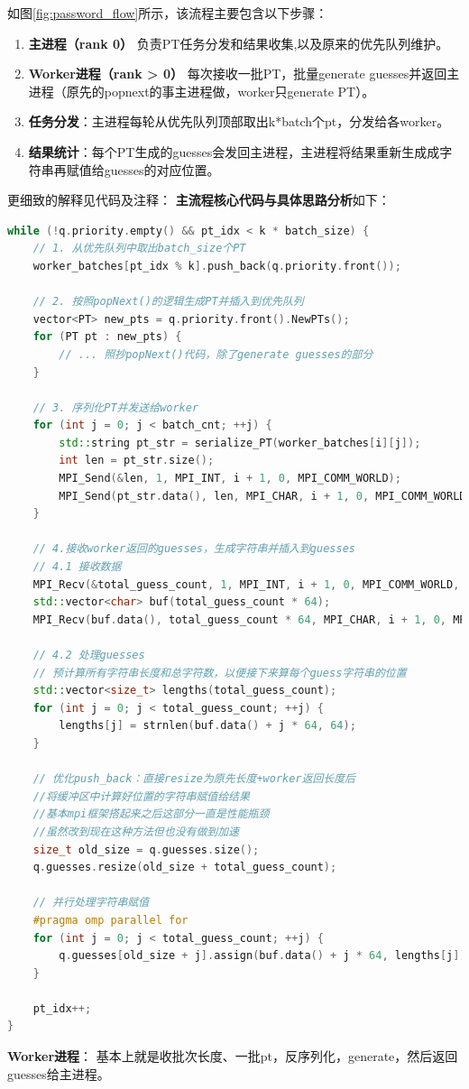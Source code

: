 \documentclass[a4paper]{article}
\begin{document}
如图\ref{fig:password_flow}所示，该流程主要包含以下步骤：
\begin{enumerate}
    \item \textbf{主进程（rank 0）} 负责PT任务分发和结果收集,以及原来的优先队列维护。
    \item \textbf{Worker进程（rank > 0）} 每次接收一批PT，批量generate guesses并返回主进程（原先的popnext的事主进程做，worker只generate PT）。
    \item \textbf{任务分发}：主进程每轮从优先队列顶部取出k*batch个pt，分发给各worker。
    \item \textbf{结果统计}：每个PT生成的guesses会发回主进程，主进程将结果重新生成成字符串再赋值给guesses的对应位置。
\end{enumerate}
更细致的解释见代码及注释：
\textbf{主流程核心代码与具体思路分析}如下：
\begin{lstlisting}[language=C++, caption={MPI并行密码生成算法核心代码}]
while (!q.priority.empty() && pt_idx < k * batch_size) {
    // 1. 从优先队列中取出batch_size个PT
    worker_batches[pt_idx % k].push_back(q.priority.front());
    
    // 2. 按照popNext()的逻辑生成PT并插入到优先队列
    vector<PT> new_pts = q.priority.front().NewPTs();
    for (PT pt : new_pts) {
        // ... 照抄popNext()代码，除了generate guesses的部分
    }
    
    // 3. 序列化PT并发送给worker
    for (int j = 0; j < batch_cnt; ++j) {
        std::string pt_str = serialize_PT(worker_batches[i][j]);
        int len = pt_str.size();
        MPI_Send(&len, 1, MPI_INT, i + 1, 0, MPI_COMM_WORLD);
        MPI_Send(pt_str.data(), len, MPI_CHAR, i + 1, 0, MPI_COMM_WORLD);
    }
    
    // 4.接收worker返回的guesses，生成字符串并插入到guesses
    // 4.1 接收数据
    MPI_Recv(&total_guess_count, 1, MPI_INT, i + 1, 0, MPI_COMM_WORLD, MPI_STATUS_IGNORE);
    std::vector<char> buf(total_guess_count * 64);
    MPI_Recv(buf.data(), total_guess_count * 64, MPI_CHAR, i + 1, 0, MPI_COMM_WORLD, MPI_STATUS_IGNORE);
    
    // 4.2 处理guesses
    // 预计算所有字符串长度和总字符数，以便接下来算每个guess字符串的位置
    std::vector<size_t> lengths(total_guess_count);
    for (int j = 0; j < total_guess_count; ++j) {
        lengths[j] = strnlen(buf.data() + j * 64, 64);
    }
    
    // 优化push_back：直接resize为原先长度+worker返回长度后
    //将缓冲区中计算好位置的字符串赋值给结果
    //基本mpi框架搭起来之后这部分一直是性能瓶颈
    //虽然改到现在这种方法但也没有做到加速
    size_t old_size = q.guesses.size();
    q.guesses.resize(old_size + total_guess_count);
    
    // 并行处理字符串赋值
    #pragma omp parallel for
    for (int j = 0; j < total_guess_count; ++j) {
        q.guesses[old_size + j].assign(buf.data() + j * 64, lengths[j]);
    }
    
    pt_idx++;
}
\end{lstlisting}
\textbf{Worker进程}：
基本上就是收批次长度、一批pt，反序列化，generate，然后返回guesses给主进程。
\end{document}
